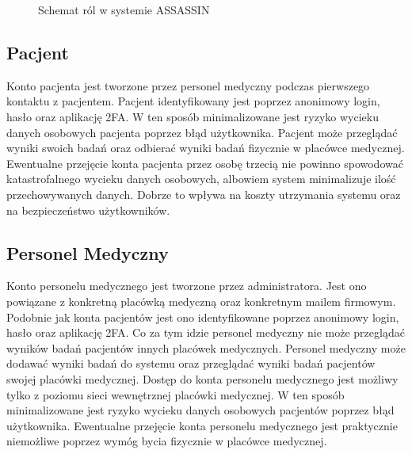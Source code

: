 \documentclass{documentation}
\begin{document}
\begin{figure}[h]
    \centering
    \caption{Schemat ról w systemie ASSASSIN\label{fig:roles}}
\end{figure}

\subsection{Pacjent}

Konto pacjenta jest tworzone przez personel medyczny podczas pierwszego kontaktu z pacjentem.
Pacjent identyfikowany jest poprzez anonimowy login, hasło oraz aplikację 2FA.
W ten sposób minimalizowane jest ryzyko wycieku danych osobowych pacjenta poprzez błąd użytkownika.
Pacjent może przeglądać wyniki swoich badań oraz odbierać wyniki badań fizycznie w placówce medycznej.
Ewentualne przejęcie konta pacjenta przez osobę trzecią nie powinno spowodować katastrofalnego wycieku danych osobowych, albowiem system minimalizuje ilość przechowywanych danych.
Dobrze to wpływa na koszty utrzymania systemu oraz na bezpieczeństwo użytkowników.

\subsection{Personel Medyczny}

Konto personelu medycznego jest tworzone przez administratora.
Jest ono powiązane z konkretną placówką medyczną oraz konkretnym mailem firmowym.
Podobnie jak konta pacjentów jest ono identyfikowane poprzez anonimowy login, hasło oraz aplikację 2FA.
Co za tym idzie personel medyczny nie może przeglądać wyników badań pacjentów innych placówek medycznych.
Personel medyczny może dodawać wyniki badań do systemu oraz przeglądać wyniki badań pacjentów swojej placówki medycznej.
Dostęp do konta personelu medycznego jest możliwy tylko z poziomu sieci wewnętrznej placówki medycznej.
W ten sposób minimalizowane jest ryzyko wycieku danych osobowych pacjentów poprzez błąd użytkownika.
Ewentualne przejęcie konta personelu medycznego jest praktycznie niemożliwe poprzez wymóg bycia fizycznie w placówce medycznej.
\end{document}
